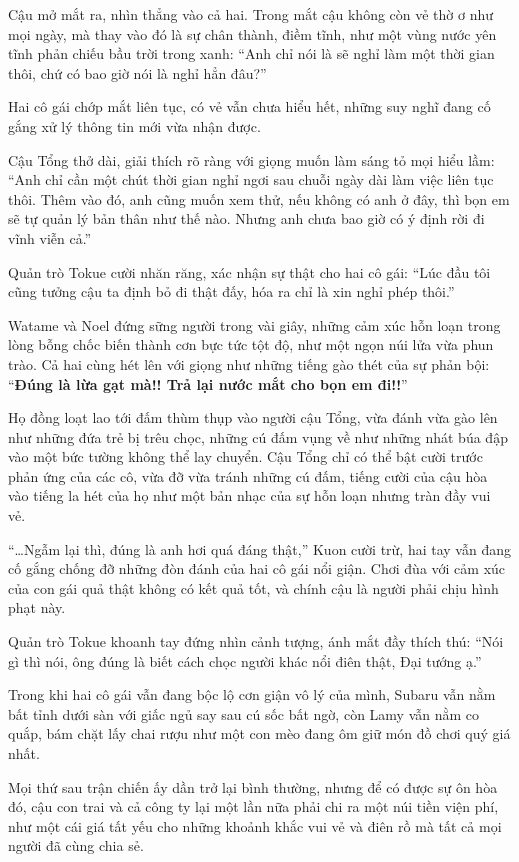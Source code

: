 \documentclass[../main.tex]{subfiles}
\begin{document}
Cậu mở mắt ra, nhìn thẳng vào cả hai. Trong mắt cậu không còn vẻ thờ ơ như mọi ngày, mà thay vào đó là sự chân thành, điềm tĩnh, như một vùng nước yên tĩnh phản chiếu bầu trời trong xanh: ``Anh chỉ nói là sẽ nghỉ làm một thời gian thôi, chứ có bao giờ nói là nghỉ hẳn đâu?''

Hai cô gái chớp mắt liên tục, có vẻ vẫn chưa hiểu hết, những suy nghĩ đang cố gắng xử lý thông tin mới vừa nhận được.

Cậu Tổng thở dài, giải thích rõ ràng với giọng muốn làm sáng tỏ mọi hiểu lầm: ``Anh chỉ cần một chút thời gian nghỉ ngơi sau chuỗi ngày dài làm việc liên tục thôi. Thêm vào đó, anh cũng muốn xem thử, nếu không có anh ở đây, thì bọn em sẽ tự quản lý bản thân như thế nào. Nhưng anh chưa bao giờ có ý định rời đi vĩnh viễn cả.''

Quản trò Tokue cười nhăn răng, xác nhận sự thật cho hai cô gái: ``Lúc đầu tôi cũng tưởng cậu ta định bỏ đi thật đấy, hóa ra chỉ là xin nghỉ phép thôi.''

Watame và Noel đứng sững người trong vài giây, những cảm xúc hỗn loạn trong lòng bỗng chốc biến thành cơn bực tức tột độ, như một ngọn núi lửa vừa phun trào. Cả hai cùng hét lên với giọng như những tiếng gào thét của sự phản bội: ``\textbf{Đúng là lừa gạt mà!! Trả lại nước mắt cho bọn em đi!!}''

Họ đồng loạt lao tới đấm thùm thụp vào người cậu Tổng, vừa đánh vừa gào lên như những đứa trẻ bị trêu chọc, những cú đấm vụng về như những nhát búa đập vào một bức tường không thể lay chuyển. Cậu Tổng chỉ có thể bật cười trước phản ứng của các cô, vừa đỡ vừa tránh những cú đấm, tiếng cười của cậu hòa vào tiếng la hét của họ như một bản nhạc của sự hỗn loạn nhưng tràn đầy vui vẻ.

``\dots Ngẫm lại thì, đúng là anh hơi quá đáng thật,'' Kuon cười trừ, hai tay vẫn đang cố gắng chống đỡ những đòn đánh của hai cô gái nổi giận. Chơi đùa với cảm xúc của con gái quả thật không có kết quả tốt, và chính cậu là người phải chịu hình phạt này.

Quản trò Tokue khoanh tay đứng nhìn cảnh tượng, ánh mắt đầy thích thú: ``Nói gì thì nói, ông đúng là biết cách chọc người khác nổi điên thật, Đại tướng ạ.''

Trong khi hai cô gái vẫn đang bộc lộ cơn giận vô lý của mình, Subaru vẫn nằm bất tỉnh dưới sàn với giấc ngủ say sau cú sốc bất ngờ, còn Lamy vẫn nằm co quắp, bám chặt lấy chai rượu như một con mèo đang ôm giữ món đồ chơi quý giá nhất.

Mọi thứ sau trận chiến ấy dần trở lại bình thường, nhưng để có được sự ôn hòa đó, cậu con trai và cả công ty lại một lần nữa phải chi ra một núi tiền viện phí, như một cái giá tất yếu cho những khoảnh khắc vui vẻ và điên rồ mà tất cả mọi người đã cùng chia sẻ.
\end{document}
